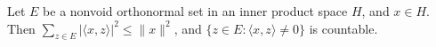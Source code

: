 Let $E$ be a nonvoid orthonormal set in an inner product space $H$, and $x \in H$. Then $\sum_{z \in E} |\langle x, z \rangle|^2 \leq \|x\|^2$, and $\{z \in E : \langle x, z \rangle \neq 0\}$ is countable.
